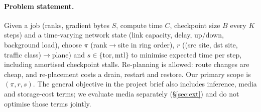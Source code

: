 \paragraph{Problem statement.}
Given a job (ranks, gradient bytes $S$, compute time $C$, checkpoint size $B$ every $K$ steps) and a
time-varying network state (link capacity, delay, up/down, background load), choose
$\pi$ (rank$\to$site in ring order), $r$ ((src site, dst site, traffic class)$\to$plane) and
$s \in \{\text{tor},\text{mtl}\}$ to minimise expected time per step, including amortised checkpoint
stalls. Re-planning is allowed: route changes are cheap, and re-placement costs a drain, restart and
restore. Our primary scope is $(\pi, r, s)$. The general objective in the project brief also includes
inference, media and storage-cost terms; we evaluate media separately (\S\ref{sec:ext}) and do not
optimise those terms jointly.
